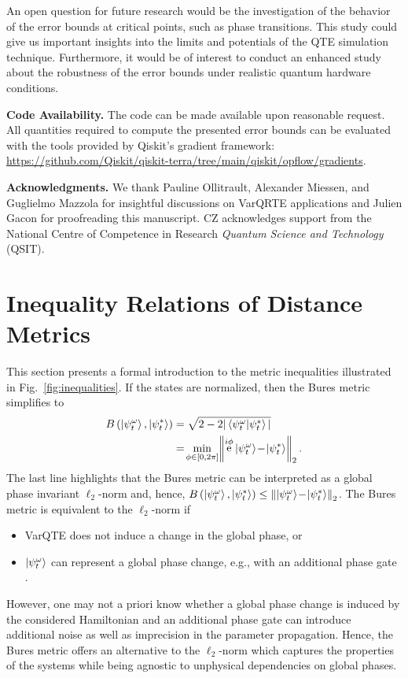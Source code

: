 \documentclass[twocolumn, aps, pra, superscriptaddress]{revtex4-1}
\DeclareMathOperator{\ee}{e}
\newcommand{\norm}[1]{\left\lVert#1\right\rVert}
\begin{document}
An open question for future research would be the investigation of the behavior of the error bounds at critical points, such as phase transitions. This study could give us important insights into the limits and potentials of the QTE simulation technique.
Furthermore, it would be of interest to conduct an enhanced study about the robustness of the error bounds under realistic quantum hardware conditions.

\vspace{3mm}

\noindent\textbf{Code Availability.}
The code can be made available upon reasonable request.
All quantities required to compute the presented error bounds can be evaluated with the tools provided by Qiskit's gradient framework:  \url{https://github.com/Qiskit/qiskit-terra/tree/main/qiskit/opflow/gradients}.

\noindent\textbf{Acknowledgments.}
We thank Pauline Ollitrault, Alexander Miessen, and Guglielmo Mazzola for insightful discussions on VarQRTE applications and Julien Gacon for proofreading this manuscript.
CZ acknowledges support from the National Centre of Competence in Research \emph{Quantum Science and Technology} (QSIT).

\appendix
\section{Inequality Relations of Distance Metrics}
\label{app:inequalities}
This section presents a formal introduction to the metric inequalities illustrated in Fig.~\ref{fig:inequalities}.
If the states are normalized, then the Bures metric simplifies to 
 \begin{align}
  \label{eq_buresPhase}
	B\left(\ket{\psi^{\omega}_t}, \ket{\psi^*_t} \right)&= \sqrt{2-2|\braket{\psi^{\omega}_t|\psi^*_t}|} \nonumber \\
	&=\!\min_{\phi \in [0,2\pi]}\!\norm{\ee^{i\phi}\ket{\psi^{\omega}_t} \!-\!\ket{\psi^*_t}}_2.
\end{align}
The last line highlights that the Bures metric can be interpreted as a global phase invariant $\ell_2$-norm and, hence, $B\left(\ket{\psi^{\omega}_t}, \ket{\psi^*_t} \right)\leq \norm{\ket{\psi^{\omega}_t} \!-\!\ket{\psi^*_t}}_2$.
The Bures metric is equivalent to the $\ell_2$-norm if
\begin{itemize}
    \item VarQTE does not induce a change in the global phase, or
    \item $\ket{\psi^{\omega}_t}$ can represent a global phase change, e.g., with an additional phase gate \cite{McKay_EfficientZ_2017}.
\end{itemize}
However, one may not a priori know whether a global phase change is induced by the considered Hamiltonian and an additional phase gate can introduce additional noise as well as imprecision in the parameter propagation.
Hence, the Bures metric offers an alternative to the $\ell_2$-norm which captures the properties of the systems while being agnostic to unphysical dependencies on global phases.
\end{document}
